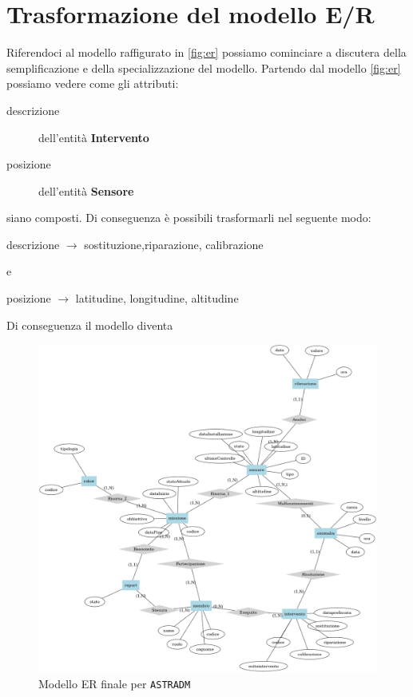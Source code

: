 \section{Trasformazione del modello E/R}
Riferendoci al modello raffigurato in \ref{fig:er} possiamo cominciare
a discutera della semplificazione e della specializzazione del
modello. Partendo dal modello \ref{fig:er} possiamo vedere come gli attributi:
\begin{description}
\item[descrizione] dell'entità \textbf{Intervento}
\item[posizione] dell'entità \textbf{Sensore}
\end{description}
siano composti. Di conseguenza è possibili trasformarli nel seguente modo:
\begin{center}
  descrizione $\rightarrow$ sostituzione,riparazione, calibrazione
\end{center}
e
\begin{center}
  posizione $\rightarrow$ latitudine, longitudine, altitudine
\end{center}

Di conseguenza il modello diventa
\begin{figure}[ht]
  \includegraphics[width=\linewidth]{images/er-finale.png}
  \caption{Modello ER finale per \texttt{ASTRADM}}
  \label{fig:er-finale}
\end{figure}
 	
